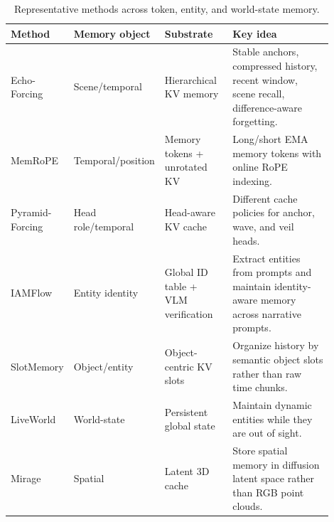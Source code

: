 \begin{table}[t]
\centering
\small
\begin{tabular}{p{0.14\linewidth}p{0.16\linewidth}p{0.22\linewidth}p{0.38\linewidth}}
\toprule
\textbf{Method} & \textbf{Memory object} & \textbf{Substrate} & \textbf{Key idea} \\
\midrule
Echo-Forcing & Scene/temporal & Hierarchical KV memory & Stable anchors, compressed history, recent window, scene recall, difference-aware forgetting. \\
MemRoPE & Temporal/position & Memory tokens + unrotated KV & Long/short EMA memory tokens with online RoPE indexing. \\
Pyramid-Forcing & Head role/temporal & Head-aware KV cache & Different cache policies for anchor, wave, and veil heads. \\
IAMFlow & Entity identity & Global ID table + VLM verification & Extract entities from prompts and maintain identity-aware memory across narrative prompts. \\
SlotMemory & Object/entity & Object-centric KV slots & Organize history by semantic object slots rather than raw time chunks. \\
LiveWorld & World-state & Persistent global state & Maintain dynamic entities while they are out of sight. \\
Mirage & Spatial & Latent 3D cache & Store spatial memory in diffusion latent space rather than RGB point clouds. \\
\bottomrule
\end{tabular}
\caption{Representative methods across token, entity, and world-state memory.}
\label{tab:representative_methods}
\end{table}
